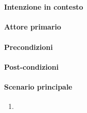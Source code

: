 \section{}\label{uc:}
\paragraph{Intenzione in contesto}
\paragraph{Attore primario}
\paragraph{Precondizioni}
\paragraph{Post-condizioni}
\paragraph{Scenario principale}
\begin{enumerate}
    \item 
\end{enumerate}